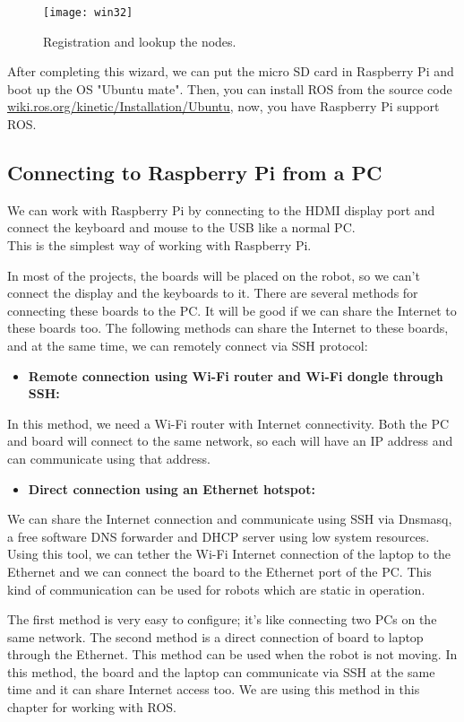\begin{figure}[h]		
	\centering
	\texttt{[image: win32]}
	\caption{Registration and lookup the nodes.}
	\label{Fig:Win32}
\end{figure}

After completing this wizard, we can put the micro SD card in Raspberry Pi and boot up the OS "Ubuntu mate". Then, you can install ROS from the source code \url{wiki.ros.org/kinetic/Installation/Ubuntu}, now, you have Raspberry Pi support ROS.

\subsection{Connecting to Raspberry Pi from a PC}

We can work with Raspberry Pi  by connecting to the HDMI display port and connect the keyboard and mouse to the USB like a normal PC.\\
This is the simplest way of working with Raspberry Pi.

In most of the projects, the boards will be placed on the robot, so we can't connect the display and the keyboards to it. There are several methods for connecting these boards to the PC. 
It will be good if we can share the Internet to these boards too. The following methods can share the Internet to these boards, and at the same time, we can remotely connect via SSH protocol:

\begin{itemize}
	\item \textbf{Remote connection using Wi-Fi router and Wi-Fi dongle through SSH:}
\end{itemize}
In this method, we need a Wi-Fi router with Internet connectivity. 
Both the PC and board will connect to the same network, so each will have an IP address and can communicate using that address.

\begin{itemize}
	\item \textbf{Direct connection using an Ethernet hotspot:}
\end{itemize}

We can share the Internet connection and communicate using SSH via Dnsmasq, a free software DNS forwarder and DHCP server using low system resources. Using this tool, we can tether the Wi-Fi Internet connection of the laptop to the Ethernet and we can connect the board to the Ethernet port of the PC. This kind of communication can be used for robots which are static in operation.

The first method is very easy to configure; it's like connecting two PCs on the same network. 
The second method is a direct connection of board to laptop through the Ethernet. This method can be used when the robot is not moving.
In this method, the board and the laptop can communicate via SSH at the same time and it can share 
Internet access too. We are using this method in this chapter for working with ROS.